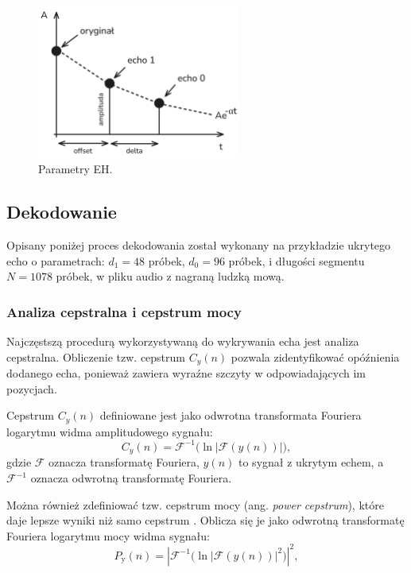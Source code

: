 \begin{figure}[ht!]
	\centering
	\includegraphics[width=0.6\textwidth]{img/echo-hiding.png}
	\caption{\label{fig:echo-hiding} Parametry EH.}
\end{figure}
\pagebreak


\subsection{Dekodowanie}

Opisany poniżej proces dekodowania został wykonany na przykładzie ukrytego echo o parametrach: $d_1=48$ próbek, $d_0=96$ próbek, i długości segmentu $N=1078$ próbek, w pliku audio z nagraną ludzką mową.

\subsubsection{Analiza cepstralna i cepstrum mocy}

Najczęstszą procedurą wykorzystywaną do wykrywania echa jest analiza cepstralna.
Obliczenie tzw. cepstrum $C_y(n)$ pozwala zidentyfikować opóźnienia dodanego echa, ponieważ zawiera wyraźne szczyty w odpowiadających im pozycjach.

Cepstrum $C_y(n)$ definiowane jest jako odwrotna transformata Fouriera logarytmu widma amplitudowego sygnału:
\begin{equation}
	C_y(n) = \mathcal{F}^{-1} \big(\ln |\mathcal{F}(y(n))|\big),
\end{equation}
gdzie $\mathcal{F}$ oznacza transformatę Fouriera, $y(n)$ to sygnał z ukrytym echem, a $\mathcal{F}^{-1}$ oznacza odwrotną transformatę Fouriera.

Można również zdefiniować tzw. cepstrum mocy (ang. \textit{power cepstrum}), które daje lepsze wyniki niż samo cepstrum \cite{auto_power_cepstrum}. Oblicza się je jako odwrotną transformatę Fouriera logarytmu mocy widma sygnału:
\begin{equation}
	P_{\text{y}}(n) = \left| \mathcal{F}^{-1} \big( \ln |\mathcal{F}(y(n))|^2 \big) \right|^2,
\end{equation}

